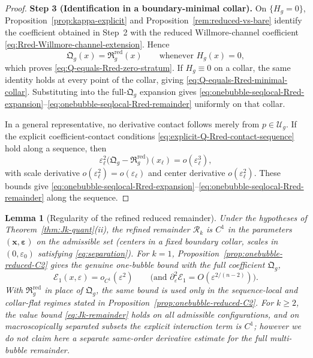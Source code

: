 \documentclass[11pt,reqno,a4paper]{amsart}
\numberwithin{equation}{section}
\theoremstyle{plain}
\newtheorem{lemma}[theorem]{Lemma}
\theoremstyle{remark}
\theoremstyle{plain}
\begin{document}
\begin{proof}
\smallskip\noindent
\textbf{Step 3 (Identification in a boundary-minimal collar).}
On $\{H_g=0\}$, Proposition~\ref{prop:kappa-explicit} and Proposition~\ref{rem:reduced-vs-bare} identify the
coefficient obtained in Step~2 with the reduced Willmore-channel coefficient
\eqref{eq:Rred-Willmore-channel-extension}.  Hence
\[
\mathfrak Q_g(x)=\mathfrak R_g^{\mathrm{red}}(x)
\qquad\text{whenever }H_g(x)=0,
\]
which proves \eqref{eq:Q-equals-Rred-zero-stratum}.  If $H_g\equiv0$ on a
collar, the same identity holds at every point of the collar, giving
\eqref{eq:Q-equals-Rred-minimal-collar}.  Substituting into the full-$\mathfrak Q_g$
expansion gives
\eqref{eq:onebubble-seqlocal-Rred-expansion}--\eqref{eq:onebubble-seqlocal-Rred-remainder}
uniformly on that collar.

In a general representative, no derivative contact follows merely from
$p\in\mathcal U_g$.  If the explicit coefficient-contact conditions
\eqref{eq:explicit-Q-Rred-contact-sequence} hold along a sequence, then
\[
\varepsilon_\ell^2
\bigl(\mathfrak Q_g-\mathfrak R_g^{\mathrm{red}}\bigr)(x_\ell)
=o(\varepsilon_\ell^3),
\]
with scale derivative $o(\varepsilon_\ell^2)=o(\varepsilon_\ell)$
and center derivative $o(\varepsilon_\ell^2)$.
These bounds give
\eqref{eq:onebubble-seqlocal-Rred-expansion}--\eqref{eq:onebubble-seqlocal-Rred-remainder}
along the sequence.
\end{proof}


\begin{lemma}[Regularity of the refined reduced remainder]\label{lem:C1-remainder}
Under the hypotheses of Theorem~\ref{thm:Jk-quant}\textup{(ii)}, the \emph{refined} remainder
$\mathcal R_k$ is $C^1$ in the parameters $(\mathbf x,\boldsymbol\varepsilon)$
on the admissible set \textup{(}centers in a fixed boundary collar, scales in $(0,\varepsilon_0)$
satisfying \eqref{eq:separation}\textup{)}.
For $k=1$, Proposition~\ref{prop:onebubble-reduced-C2} gives the genuine one-bubble bound with the
full coefficient $\mathfrak Q_g$,
\[
\mathcal E_1(x,\varepsilon)=o_{C^1}(\varepsilon^2)
\qquad\text{(and }\partial_\varepsilon^2\mathcal E_1=O(\varepsilon^{2/(n-2)})\text{)}.
\]
With $\mathfrak R_g^{\mathrm{red}}$ in place of $\mathfrak Q_g$, the same bound is used only in the
sequence-local and collar-flat regimes stated in Proposition~\ref{prop:onebubble-reduced-C2}.
For $k\ge2$, the value bound \eqref{eq:Jk-remainder} holds on all admissible configurations, and on
macroscopically separated subsets the explicit interaction term is $C^1$; however we do \emph{not} claim here
a separate same-order derivative estimate for the full multi-bubble remainder.
\end{lemma}
\end{document}
